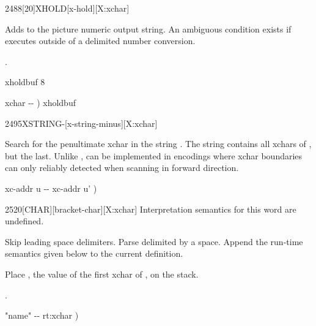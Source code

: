 \begin{worddef}{2488}[20]{XHOLD}[x-hold][X:xchar]
\item {}

	Adds  to the picture numeric output string.  An ambiguous
	condition exists if  executes outside of a 
	 delimited number conversion.

\see {}.

	\begin{implement}
	 xholdbuf 8 

	\word{:}   xchar -{}- )
		xholdbuf    \word{-}  \word{;}
	\end{implement}
\end{worddef}


\begin{worddef}[XSTRING-]{2495}{X\bs{}STRING-}[x-string-minus][X:xchar]
\item {}

	Search for the penultimate xchar in the string \param{xc-addr u_1}.
	The string  contains all xchars of
	, but the last.  Unlike \word{XCHAR-},
	 can be implemented in encodings where xchar
	boundaries can only reliably detected when scanning in forward
	direction.

	\begin{implement}
	\word{:}   xc-addr u -{}- xc-addr u' ) \\
	\tab {} \word{+}   \word{-} \word{;}
	\end{implement}
\end{worddef}


\begin{worddef}{2520}{[CHAR]}[bracket-char][X:xchar]
\interpret
	Interpretation semantics for this word are undefined.

\compile {}

	Skip leading space delimiters.  Parse  delimited by a space.
	Append the run-time semantics given below to the current definition.

\runtime {}

	Place , the value of the first xchar of , on
	the stack.

\see {}.

	\begin{implement}
	\word{:} \word{[CHAR]}  "name" -{}- rt:xchar ) \\
	\tab {}   \word{;} \word{IMMEDIATE}
	\end{implement}
\end{worddef}

\endinput

